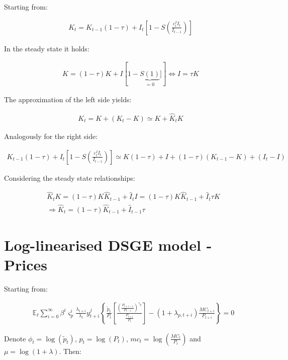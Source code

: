 \documentclass{pracamgr}
\numberwithin{equation}{section}
\begin{document}
Starting from:

\begin{align}
K_{t} = K_{t-1} (1 - \tau) + I_{t} \left[ 1 - S \left(\frac{\varepsilon_{t}^{I}I_{t}}{I_{t-1}} \right) \right]
\end{align}

In the steady state it holds:

\begin{align}
K =  (1 - \tau)K + I \left[ 1 - \underbrace{S (1)}_{=0}] \right] \iff I = \tau K
\end{align}

The approximation of the left side yields:

\begin{align}
K_{t} = K + \left(K_{t} - K \right) \simeq K + \hat{K}_{t}K
\end{align}

Analogously for the right side:

\begin{align}
K_{t-1} (1 - \tau) + I_{t} \left[ 1 - S \left(\frac{\varepsilon_{t}^{I}I_{t}}{I_{t-1}} \right) \right] \simeq K(1 - \tau) + I + (1 - \tau) \left(K_{t-1} - K \right) + \left( I_{t} - I \right)
\end{align}

Considering the steady state relationships:

{\color{red}  \begin{align}
&\hat{K}_{t}K = (1 - \tau)K \hat{K}_{t-1} + \hat{I}_{t}I = (1 - \tau)K \hat{K}_{t-1} + \hat{I}_{t}\tau K \nonumber \\
& \Rightarrow \hat{K}_{t} = (1 - \tau) \hat{K}_{t-1} + \hat{I}_{t-1}\tau
\end{align} }

\section*{Log-linearised DSGE model - Prices}

Starting from:

\begin{align} &\mathbb{E}_{t}  \sum\limits_{i=0}^{\infty} \beta^{i} \varsigma_{p}^{i} \frac{\lambda_{t+i}}{\lambda_{t}} y_{t+i}^{j} \left\{ \frac{\widetilde{p}_{t}}{P_{t}} \left[ \frac{ \left(\frac{P_{t+i-1}}{P_{t-1}} \right)^{\gamma_{p}}}{\frac{P_{t+i}}{P_{t}}} \right] - (1+\lambda_{p,t+i})\frac{MC_{t+i}}{P_{t+i}} \right\} = 0
\end{align}

Denote $\phi_{t} = \log(\widetilde{p}_{t})$, $p_{t} = \log(P_{t})$, $mc_{t} = \log \left(\frac{MC_{t}}{P_{t}} \right)$ and $ \mu = \log(1+\lambda)$. Then:
\end{document}
